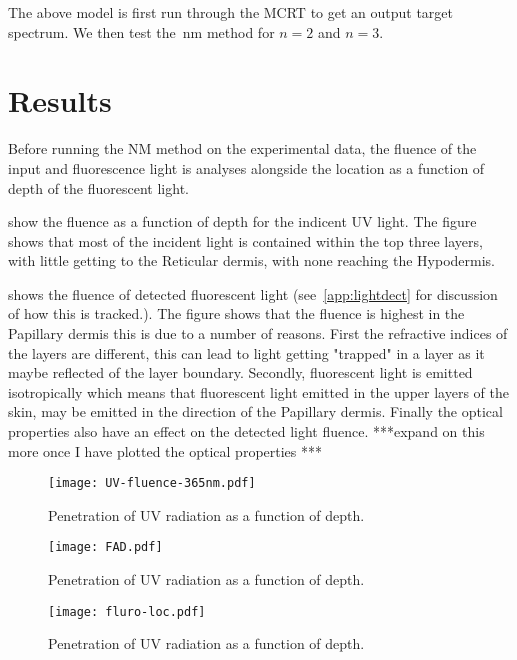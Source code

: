 The above model is first run through the MCRT to get an output target spectrum.
We then test the~\gls*{nm} method for $n=2$ and $n=3$.


\section{Results}

Before running the NM method on the experimental data, the fluence of the input and fluorescence light is analyses alongside the location as a function of depth of the fluorescent light.

 show the fluence as a function of depth for the indicent UV light.
The figure shows that most of the incident light is contained within the top three layers, with little getting to the Reticular dermis, with none reaching the Hypodermis.

 shows the fluence of detected fluorescent light (see~\cref{app:lightdect} for discussion of how this is tracked.).
The figure shows that the fluence is highest in the Papillary dermis this is due to a number of reasons.
First the refractive indices of the layers are different, this can lead to light getting "trapped" in a layer as it maybe reflected of the layer boundary.
Secondly, fluorescent light is emitted isotropically which means that fluorescent light emitted in the upper layers of the skin, may be emitted in the direction of the Papillary dermis.
Finally the optical properties also have an effect on the detected light fluence.
***expand on this more once I have plotted the optical properties ***

\begin{figure}[!htpb]
    \centering
    \texttt{[image: UV-fluence-365nm.pdf]}
    \caption{Penetration of UV radiation as a function of depth.}
    \label{fig:uvpen}
\end{figure}

\begin{figure}[!htpb]
    \centering
    \texttt{[image: FAD.pdf]}
    \caption{Penetration of UV radiation as a function of depth.}
    \label{fig:fadnadhboth}
\end{figure}

\begin{figure}[!htpb]
    \centering
    \texttt{[image: fluro-loc.pdf]}
    \caption{Penetration of UV radiation as a function of depth.}
    \label{fig:floc}
\end{figure}

